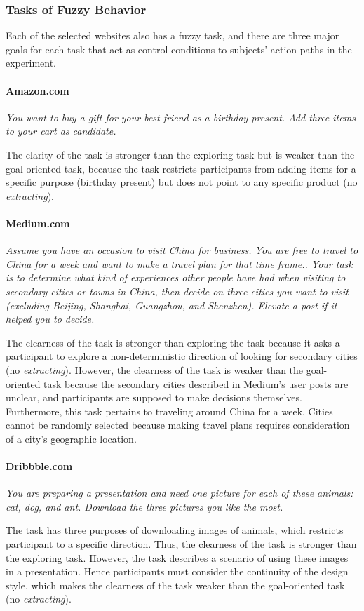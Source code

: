 \subsubsection{Tasks of Fuzzy Behavior}

Each of the selected websites also has a fuzzy task, and there are three major goals for each task that act
as control conditions to subjects' action paths in the experiment.

\paragraph{Amazon.com} \emph{You want to buy a gift for your best friend as a birthday present.
        Add three items to your cart as candidate.}

The clarity of the task is stronger than the exploring task but is weaker than 
the goal-oriented task, because
the task restricts participants from adding items for a specific purpose (birthday present) 
but does not point to any specific product (no \emph{extracting}).

\paragraph{Medium.com} \emph{Assume you have an occasion to visit China for business. 
        You are free to travel to China for a week and want to make a travel plan for that time frame.. 
        Your task is to determine what kind 
        of experiences other people have had when visiting to secondary cities or towns in China, then decide 
        on three cities you want to visit (excluding Beijing, Shanghai, Guangzhou, and Shenzhen). 
        Elevate a post if it helped you to decide.}

The clearness of the task is stronger than exploring the task because it asks a participant 
to explore a non-deterministic direction of looking for secondary cities (no \emph{extracting}).
However, the clearness of the task is weaker than the goal-oriented task because 
the secondary cities described in Medium's user posts are unclear, and participants are 
supposed to make decisions themselves.
Furthermore, this task pertains to traveling around  China for a week. 
Cities cannot be randomly
selected because making travel plans requires consideration of a city's geographic 
location.

\paragraph{Dribbble.com} \emph{You are preparing a presentation and need one picture for each of these animals: 
    cat, dog, and ant. Download the three pictures you like the most.}

The task has three purposes of downloading images of animals, which restricts participant to a specific direction.
Thus, the clearness of the task is stronger than the exploring task. 
However, the task describes a scenario of using
these images in a presentation. Hence participants must consider the continuity of 
the design style, which makes the clearness of the task weaker than 
the goal-oriented task (no \emph{extracting}).

\cleardoublepage